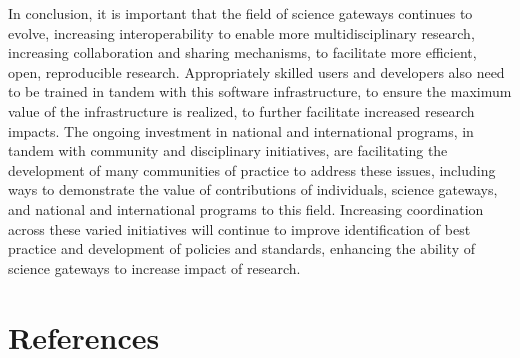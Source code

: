 \documentclass[review]{elsarticle}
\begin{document}
In conclusion, it is important that the field of science gateways continues to evolve, increasing interoperability to enable more multidisciplinary research, increasing collaboration and sharing mechanisms, to facilitate more efficient, open, reproducible research. Appropriately skilled users and developers also need to be trained in tandem with this software infrastructure, to ensure the maximum value of the infrastructure is realized, to further facilitate increased research impacts. The ongoing investment in national and international programs, in tandem with community and disciplinary initiatives, are facilitating the development of many communities of practice to address these issues, including ways to demonstrate the value of contributions of individuals, science gateways, and national and international programs to this field. Increasing coordination across these varied initiatives will continue to improve identification of best practice and development of policies and standards, enhancing the ability of science gateways to increase impact of research.


\section*{References}



\clearpage
\end{document}
